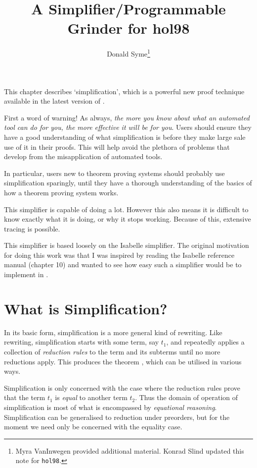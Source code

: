 \documentclass[a4]{article}
\title{A Simplifier/Programmable Grinder for hol98}
\author{Donald Syme\thanks{Myra VanInwegen provided additional
material. Konrad Slind updated this note for {\tt hol98}.}}
\begin{document}
\maketitle

This chapter describes `simplification', which is a powerful new proof
technique available in the latest version of \HOL.

First a word of warning! As always, {\em the more you know about what an
  automated tool can do for you, the more effective it will be for
  you}. Users should ensure they have a good understanding of what
  simplification is before they make large sale use of it in their
  proofs.  This will help avoid the plethora of problems that develop
  from the misapplication of automated tools.

In particular, users new to theorem proving systems should probably
use simplification sparingly, until they have a thorough understanding
of the basics of how a theorem proving system works.

This simplifier is capable of doing a lot.  However this also means it
is difficult to know exactly what it is doing, or why it stops
working.  Because of this, extensive tracing is possible.

This simplifier is based loosely on the Isabelle simplifier.  The
original motivation for doing this work was that I was inspired by
reading the Isabelle reference manual (chapter 10) and wanted to see
how easy such a simplifier would be to implement in \HOL.

\section{What is Simplification?}

In its basic form, simplification is a more general kind of
rewriting. Like rewriting, simplification starts with some term, say
$t_1$, and repeatedly applies a collection of {\it reduction rules} to
the term and its subterms until no more reductions apply.  This produces
the theorem , which can be utilised in various
ways.

Simplification is only concerned with the case where the reduction rules
prove that the term $t_1$ is {\it equal} to another term $t_2$.  Thus
the domain of operation of simplification is most of what is encompassed
by {\it equational reasoning}.  Simplification can be generalised to
reduction under preorders, but for the moment we need only be concerned
with the equality case.
\end{document}
